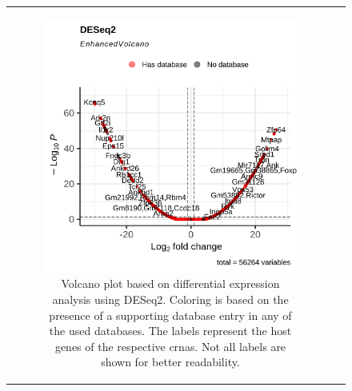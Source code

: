 \begin{figure}[H] \begin{tabular}{cc} \begin{subfigure}{0.5\textwidth}
                 \centering

                 \includegraphics[width=\linewidth]{chapters/4_results_and_discussion/figures/dea/deseq2/esr1/volcano.png}
                 \caption{Volcano plot based on differential expression
                     analysis using DESeq2.
                     Coloring is based on the presence of a supporting database entry in any of the
                     used databases.
                     The labels represent the host genes of the respective \glspl{crna}.
                     Not all labels are shown for better readability.
                 } \label{fig:esr1_volcano} \end{subfigure}
        \begin{subfigure}{0.5\textwidth} \centering


\end{subfigure}
\end{tabular}
\end{figure}
